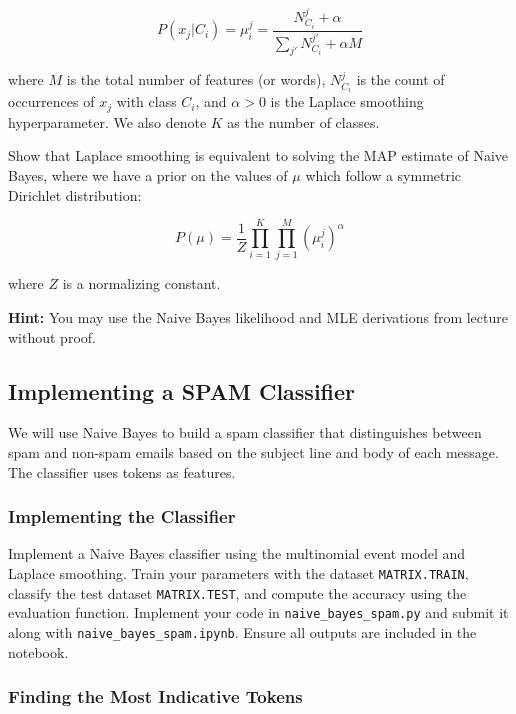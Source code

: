\documentclass[lang=cn,11pt]{elegantbook}
\begin{document}
\begin{equation}
    P(x_j | C_i) = \mu_i^j = \frac{N_{C_i}^j + \alpha}{\sum_{j'} N_{C_i}^{j'} + \alpha M}
\end{equation}

where $M$ is the total number of features (or words), $N_{C_i}^j$ is the count of occurrences of $x_j$ with class $C_i$, and $\alpha > 0$ is the Laplace smoothing hyperparameter. We also denote $K$ as the number of classes.

Show that Laplace smoothing is equivalent to solving the MAP estimate of Naive Bayes, where we have a prior on the values of $\mu$ which follow a symmetric Dirichlet distribution:

\begin{equation}
    P(\mu) = \frac{1}{Z} \prod_{i=1}^{K} \prod_{j=1}^{M} (\mu_i^j)^\alpha
\end{equation}

where $Z$ is a normalizing constant.

\textbf{Hint:} You may use the Naive Bayes likelihood and MLE derivations from lecture without proof.

\subsection{Implementing a SPAM Classifier}

We will use Naive Bayes to build a spam classifier that distinguishes between spam and non-spam emails based on the subject line and body of each message. The classifier uses tokens as features.

\subsubsection{Implementing the Classifier}

Implement a Naive Bayes classifier using the multinomial event model and Laplace smoothing. Train your parameters with the dataset \texttt{MATRIX.TRAIN}, classify the test dataset \texttt{MATRIX.TEST}, and compute the accuracy using the evaluation function. Implement your code in \texttt{naive\_bayes\_spam.py} and submit it along with \texttt{naive\_bayes\_spam.ipynb}. Ensure all outputs are included in the notebook.

\subsubsection{Finding the Most Indicative Tokens}
\end{document}
